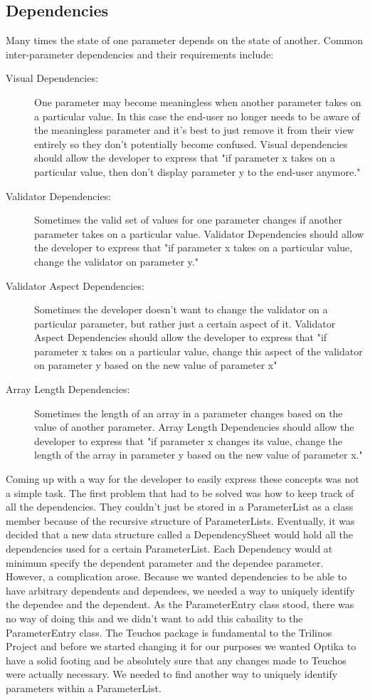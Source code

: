 	\subsection{Dependencies}
	Many times the state of one parameter depends on the state of another. Common inter-parameter dependencies and their requirements include:
	\begin{description}
		\item[Visual Dependencies:] One parameter may become meaningless when another parameter takes on a particular value.
		In this case the end-user no longer needs to be aware of the meaningless parameter and it's best to just remove it from
		their view entirely so they don't potentially become confused. Visual dependencies should allow the developer to express that "if parameter 
		x takes on a particular value, then don't display parameter y to the end-user anymore."
		\item[Validator Dependencies:] Sometimes the valid set of values for one parameter changes if another parameter takes
		on a particular value. Validator Dependencies should allow the developer to express that "if parameter x takes on a particular value, change
		the validator on parameter y."
		\item[Validator Aspect Dependencies:] Sometimes the developer doesn't want to change the validator on a particular parameter, but
		rather just a certain aspect of it. Validator Aspect Dependencies should allow the developer to express that "if parameter x takes on a particular value,
		change this aspect of the validator on parameter y based on the new value of parameter x"
		\item[Array Length Dependencies:] Sometimes the length of an array in a parameter changes based on the value of another parameter.
		Array Length Dependencies should allow the developer to express that "if parameter x changes its value, change the length of the array
		in parameter y based on the new value of parameter x."
	\end{description}

	Coming up with a way for the developer to easily express these concepts was not a simple task. The first problem that had to be solved was how to keep track of all the dependencies.
	They couldn't just be stored in a ParameterList as a class member because of the recursive structure of ParameterLists. Eventually, it was decided that a new data structure called
	a DependencySheet would hold all the dependencies used for a certain ParameterList. Each Dependency would at minimum specify the dependent parameter
	and the dependee parameter. However, a complication arose. Because we wanted dependencies to be able to have arbitrary dependents and dependees, we needed
	a way to uniquely identify the dependee and the dependent. As the ParameterEntry class stood, there was no way of doing this and we didn't want to add this cabaility to the
	ParameterEntry class. The Teuchos package is fundamental to the Trilinos Project and before we started changing it for our purposes we wanted Optika to have a solid footing and
	be absolutely sure that any changes made to Teuchos were actually necessary. We needed to find another way to uniquely identify parameters within a ParameterList.
	
